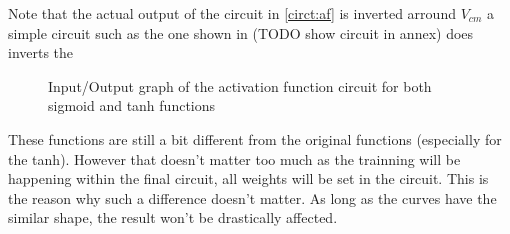 Note that the actual output of the circuit in \cref{circt:af} is inverted arround $V_{cm}$ a simple circuit such as the one shown in  (TODO show circuit in annex) does inverts the

\begin{figure}[H]
  \centering
  
  \caption{Input/Output graph of the activation function circuit for both sigmoid and \acs{tanh} functions}
  \label{fig:afGraph}
\end{figure}

These functions are still a bit different from the original functions (especially for the \ac{tanh}). However that doesn't matter too much as the trainning will be happening within the final circuit, all weights will be set in the circuit. This is the reason why such a difference doesn't matter. As long as the curves have the similar shape, the result won't be drastically affected.
